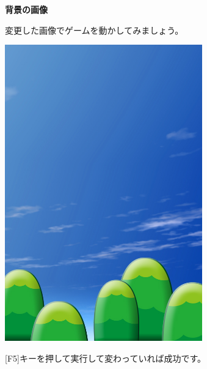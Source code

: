 \documentclass[a4paper,dvipdfmx]{jarticle}
\newcommand\textstyleqwerty[1]{#1}
\begin{document}
\bigskip


\bigskip


\bigskip


\bigskip


\bigskip


\bigskip


\bigskip


\bigskip


\bigskip


\bigskip


\bigskip


\bigskip


\bigskip

\textstyleqwerty{\textbf{背景の画像}}


\bigskip


\bigskip


\bigskip


\bigskip


\bigskip

\textstyleqwerty{変更した画像でゲームを動かしてみましょう。}

\begin{center}
\includegraphics[width=8.546cm,height=12.804cm]{text04-img/text04-img032.jpg}

\end{center}
[F5]キーを押して実行して変わっていれば成功です。
\end{document}
